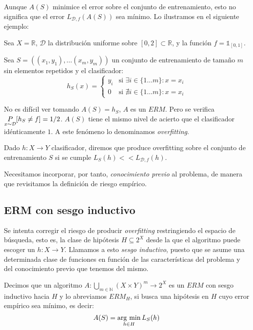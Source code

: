 Aunque $A(S)$ minimice el error sobre el conjunto de entrenamiento, esto no significa que el error $L_{\mathcal{D},f} (A(S))$ 
sea mínimo. Lo ilustramos en el siguiente ejemplo:

\begin{example}
Sea $X = \mathbb{R}$, $\mathcal{D}$ la distribución uniforme sobre $[0,2]\subset \mathbb{R}$, y la función
$f= \mathds{1}_{[0,1]}$.

Sea $S = ((x_1,y_1), \ldots (x_m, y_m))$ un conjunto de entrenamiento de tamaño $m$ sin elementos repetidos 
y el clasificador:
\[
  h_S(x) = \left\{\begin{array}{ll}
                   y_i & \textrm{si } \exists i\in \{1\ldots m\} : x=x_i\\
                   0   & \textrm{si } \nexists i\in \{1\ldots m\} : x=x_i
                   \end{array}\right.
\]

No es difícil ver tomando $A(S) = h_S$, $A$ es un $ERM$. Pero se verifica $\underset{x\sim \mathcal{D}}{P}[h_S \neq f] = 1/2$. $A(S)$ tiene el 
mismo nivel de acierto que el clasificador idénticamente $1$. A este fenómeno lo denominamos \textit{overfitting}.
\end{example}

\begin{definition}[Overfitting]
 Dado $h: X\rightarrow Y$ clasificador, diremos que produce overfitting sobre el conjunto de entrenamiento 
 $S$ si se cumple $L_S(h) << L_{\mathcal{D},f}(h)$.
\end{definition}

Necesitamos incorporar, por tanto, \textit{conocimiento previo} al problema, de manera que revisitamos la definición de riesgo
empírico.

\subsection{ERM con sesgo inductivo}
Se intenta corregir el riesgo de producir \emph{overfitting} restringiendo el espacio de búsqueda, esto es, la clase de 
hipótesis $H \subseteq 2^X$ desde la que el algoritmo puede escoger un $h: X\rightarrow Y$. Llamamos a esto 
\emph{sesgo inductivo}, puesto que se asume una determinada clase de funciones en función de las 
características del problema y del conocimiento previo que tenemos del mismo.

\begin{definition}
Decimos que un algoritmo $A: \underset{m\in \mathbb{N}}{\bigcup} (X\times Y)^m \rightarrow 2^{X}$ es un $ERM$ con sesgo 
inductivo hacia $H$ y lo abreviamos $ERM_H$, si busca una hipótesis en $H$ cuyo error empírico 
sea mínimo, es decir:
\[
  A(S) = \operatorname*{arg\,\min}_{h\in H} L_S(h)
\]
\end{definition}


